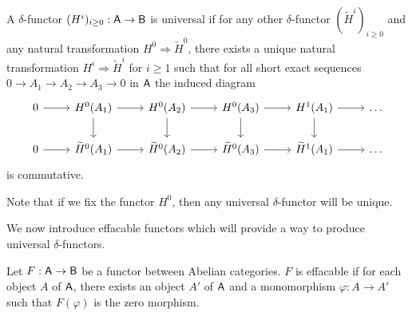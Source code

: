 \begin{definition}\label{def: universal delta functor}
    A $\delta$-functor $(H^{i})_{i\geq0}:\mathsf{A}\to\mathsf{B}$ is universal if for any other $\delta$-functor $(\widetilde{H}^{i})_{i\geq0}$ and any natural transformation $H^{0}\Rightarrow \widetilde{H}^{0}$, there exists a unique natural transformation $H^{i}\Rightarrow\widetilde{H}^{i}$ for $i\geq 1$ such that for all short exact sequences $0\to A_{1}\to A_{2}\to A_{3}\to 0$ in $\mathsf{A}$ the induced diagram 
    $$%
    \begin{tikzcd}
        0 & {H^{0}(A_{1})} & {H^{0}(A_{2})} & {H^{0}(A_{3})} & {H^{1}(A_{1})} & \dots \\
        0 & {\widetilde{H}^{0}(A_{1})} & {\widetilde{H}^{0}(A_{2})} & {\widetilde{H}^{0}(A_{3})} & {\widetilde{H}^{1}(A_{1})} & \dots
        \arrow[from=1-1, to=1-2]
        \arrow[from=1-2, to=1-3]
        \arrow[from=1-2, to=2-2]
        \arrow[from=1-3, to=1-4]
        \arrow[from=1-3, to=2-3]
        \arrow[from=1-4, to=1-5]
        \arrow[from=1-4, to=2-4]
        \arrow[from=1-5, to=1-6]
        \arrow[from=1-5, to=2-5]
        \arrow[from=2-1, to=2-2]
        \arrow[from=2-2, to=2-3]
        \arrow[from=2-3, to=2-4]
        \arrow[from=2-4, to=2-5]
        \arrow[from=2-5, to=2-6]
    \end{tikzcd}$$
    is commutative. 
\end{definition}
\begin{remark}
    Note that if we fix the functor $H^{0}$, then any universal $\delta$-functor will be unique. 
\end{remark}
We now introduce effacable functors which will provide a way to produce universal $\delta$-functors. 
\begin{definition}\label{def: effacable functor}
    Let $F:\mathsf{A}\to\mathsf{B}$ be a functor between Abelian categories. $F$ is effacable if for each object $A$ of $\mathsf{A}$, there exists an object $A'$ of $\mathsf{A}$ and a monomorphism $\varphi:A\to A'$ such that $F(\varphi)$ is the zero morphism. 
\end{definition}
